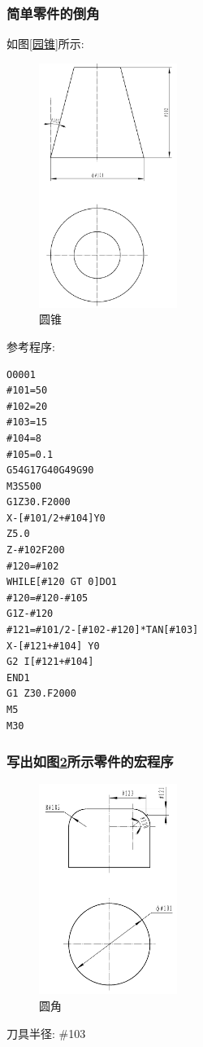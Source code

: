 \subsubsection{简单零件的倒角}
如图\ref{园锥}所示:
\begin{figure}[!hbtp]
	\centering	\includegraphics[width=0.4\textwidth]{images/13-1.jpg}
	\caption{圆锥} \label{圆锥}
\end{figure}
参考程序:
\begin{lstlisting}
O0001
#101=50
#102=20
#103=15
#104=8
#105=0.1
G54G17G40G49G90
M3S500
G1Z30.F2000
X-[#101/2+#104]Y0
Z5.0
Z-#102F200
#120=#102
WHILE[#120 GT 0]DO1
#120=#120-#105
G1Z-#120
#121=#101/2-[#102-#120]*TAN[#103]
X-[#121+#104] Y0
G2 I[#121+#104]
END1
G1 Z30.F2000
M5
M30
\end{lstlisting}
\subsubsection{写出如图\ref{圆角}所示零件的宏程序}
\begin{figure}[!hbtp]
	\centering	\includegraphics[width=0.4\textwidth]{images/13-2.jpg}
	\caption{圆角} \label{圆角}
\end{figure}
刀具半径: \#103

